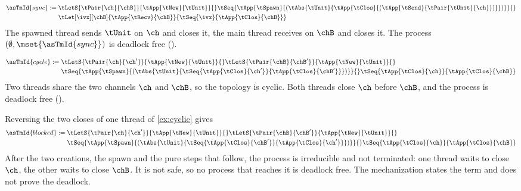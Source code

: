 \begin{example}
\label{ex:sync}
  \begin{align*}
    \asTmId{sync} := {}
      & \tLetS{\tPair{\ch}{\chB}}{\tApp{\tNew}{\tUnit}}{}
        \tSeq{\tApp{\tSpawn}{(\tAbs{\tUnit}{\tApp{\tClos}{(\tApp{\tSend}{\tPair{\tUnit}{\ch}})}})}}{}
      \\
      & \tLet[\ivx][\chB]{\tApp{\tRecv}{\chB}}{\tSeq{\ivx}{\tApp{\tClos}{\chB}}}
  \end{align*}
  The spawned thread sends $\tUnit$ on $\ch$ and closes it, the main
  thread receives on $\chB$ and closes it. The process
  $(\emptyset, \mset{\asTmId{sync}})$ is deadlock free
  ().
\end{example}

\begin{example}
\label{ex:cyclic}
  \begin{align*}
    \asTmId{cycle} := {}
      & \tLetS{\tPair{\ch}{\ch'}}{\tApp{\tNew}{\tUnit}}{}
        \tLetS{\tPair{\chB}{\chB'}}{\tApp{\tNew}{\tUnit}}{}
      \\
      & \tSeq{\tApp{\tSpawn}{(\tAbs{\tUnit}{\tSeq{\tApp{\tClos}{\ch'}}{\tApp{\tClos}{\chB'}}})}}{}
        \tSeq{\tApp{\tClos}{\ch}}{\tApp{\tClos}{\chB}}
  \end{align*}
  Two threads share the two channels $\ch$ and $\chB$, so the topology
  is cyclic. Both threads close $\ch$ before $\chB$, and the process is
  deadlock free ().
\end{example}

\begin{example}
\label{ex:deadlock}
  Reversing the two closes of one thread of \cref{ex:cyclic} gives
  \begin{align*}
    \asTmId{blocked} := {}
      & \tLetS{\tPair{\ch}{\ch'}}{\tApp{\tNew}{\tUnit}}{}
        \tLetS{\tPair{\chB}{\chB'}}{\tApp{\tNew}{\tUnit}}{}
      \\
      & \tSeq{\tApp{\tSpawn}{(\tAbs{\tUnit}{\tSeq{\tApp{\tClos}{\chB'}}{\tApp{\tClos}{\ch'}}})}}{}
        \tSeq{\tApp{\tClos}{\ch}}{\tApp{\tClos}{\chB}}
  \end{align*}
  After the two creations, the spawn and the pure steps that follow,
  the process is irreducible and
  not terminated: one thread waits to close $\ch$, the other waits to
  close $\chB$. It is not safe, so no process that reaches it is
  deadlock free. The mechanization states the term and does not prove
  the deadlock.
\end{example}

